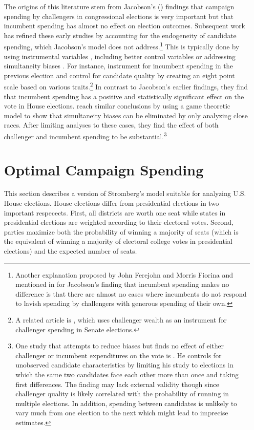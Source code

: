 \documentclass[12pt,final,fleqn]{article}
\theoremstyle{plain}
\begin{document}
The origins of this literature stem from Jacobson's (\citeyear{jacobson1978effects, jacobson1980money, jacobson1985money}) findings that campaign spending by challengers in congressional elections is very important but that incumbent spending has almost no effect on election outcomes. Subsequent work has refined these early studies by accounting for the endogeneity of candidate spending, which Jacobson's model does not address.\footnote{Another explanation proposed by John Ferejohn and Morris Fiorina and mentioned in \citet{jacobson1985money} for Jacobson's finding that incumbent spending makes no difference is that there are almost no cases where incumbents do not respond to lavish spending by challengers with generous spending of their own.}  This is typically done by using instrumental variables \citep{gerber1998estimating, green1988salvation}, including better control variables \citep{green1988salvation} or addressing simultaneity biases \citep{erikson2000equilibria}. For instance, \citet{green1988salvation} instrument for incumbent spending in the previous election and control for candidate quality by creating an eight point scale based on various traits.\footnote{A related article is \citet{gerber1998estimating}, which uses challenger wealth as an instrument for challenger spending in Senate elections.} In contrast to Jacobson's earlier findings, they find that incumbent spending has a positive and statistically significant effect on the vote in House elections. \citet{erikson2000equilibria} reach similar conclusions by using a game theoretic model to show that simultaneity biases can be eliminated by only analyzing close races. After limiting analyses to these cases, they find the effect of both challenger and incumbent spending to be substantial.\footnote{One study that attempts to reduce biases but finds no effect of either challenger or incumbent expenditures on the vote is \citet{levitt1994using}. He controls for unobserved candidate characteristics by limiting his study to elections in which the same two candidates face each other more than once and taking first differences. The finding may lack external validity though since challenger quality is likely correlated with the probability of running in multiple elections. In addition, spending between candidates is unlikely to vary much from one election to the next which might lead to imprecise estimates.} 

\section{Optimal Campaign Spending}
This section describes a version of Stromberg's \citeyear{stromberg2008electoral} model suitable for analyzing U.S. House elections. House elections differ from presidential elections in two important respecects. First, all districts are worth one seat while states in presidential elections are weighted according to their electoral votes. Second, parties maximize both the probability of winning a majority of seats (which is the equivalent of winning a majority of electoral college votes in presidential elections) and the expected number of seats. 
\end{document}
